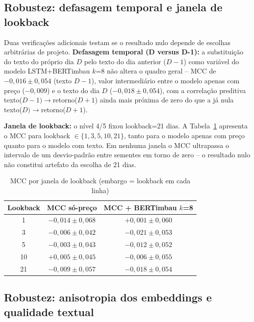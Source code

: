 \documentclass[conference]{IEEEtran}
\begin{document}
\subsection{Robustez: defasagem temporal e janela de lookback}
\label{sec:robustez}

Duas verifica\c{c}\~oes adicionais testam se o resultado nulo depende de escolhas arbitr\'arias de projeto. \textbf{Defasagem temporal (D versus D-1):} a substitui\c{c}\~ao do texto do pr\'oprio dia $D$ pelo texto do dia anterior ($D-1$) como vari\'avel do modelo LSTM+BERTimbau $k$=8 n\~ao altera o quadro geral -- MCC de $-0{,}016\pm0{,}054$ (texto $D-1$), valor intermedi\'ario entre o modelo apenas com pre\c{c}o ($-0{,}009$) e o texto do dia $D$ ($-0{,}018\pm0{,}054$), com a correla\c{c}\~ao preditiva texto($D-1)\to$retorno($D+1$) ainda mais pr\'oxima de zero do que a j\'a nula texto($D)\to$retorno($D+1$).

\textbf{Janela de lookback:} o n\'ivel 4/5 fixou lookback=21 dias. A Tabela~\ref{tab:lookback} apresenta o MCC para lookback $\in\{1,3,5,10,21\}$, tanto para o modelo apenas com pre\c{c}o quanto para o modelo com texto. Em nenhuma janela o MCC ultrapassa o intervalo de um desvio-padr\~ao entre sementes em torno de zero -- o resultado nulo n\~ao constitui artefato da escolha de 21 dias.

\begin{table}[htbp]
\caption{MCC por janela de lookback (embargo = lookback em cada linha)}
\begin{center}
\begin{tabular}{ccc}
\toprule
\textbf{Lookback} & \textbf{MCC s\'o-pre\c{c}o} & \textbf{MCC + BERTimbau $k$=8} \\
\midrule
1  & $-0{,}014\pm0{,}068$ & $+0{,}001\pm0{,}060$ \\
3  & $-0{,}006\pm0{,}042$ & $-0{,}021\pm0{,}053$ \\
5  & $-0{,}003\pm0{,}043$ & $-0{,}012\pm0{,}052$ \\
10 & $+0{,}005\pm0{,}045$ & $-0{,}006\pm0{,}055$ \\
21 & $-0{,}009\pm0{,}057$ & $-0{,}018\pm0{,}054$ \\
\bottomrule
\end{tabular}
\label{tab:lookback}
\end{center}
\end{table}

\subsection{Robustez: anisotropia dos embeddings e qualidade textual}
\label{sec:anisotropia}
\end{document}
